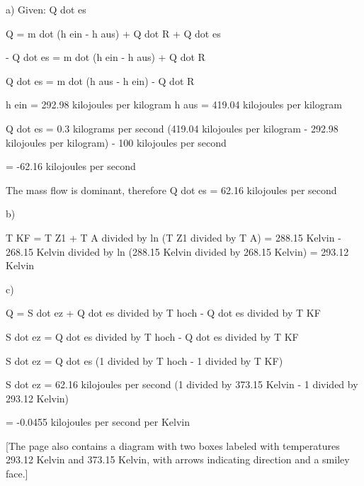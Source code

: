 a) Given: Q dot es

Q = m dot (h ein - h aus) + Q dot R + Q dot es

- Q dot es = m dot (h ein - h aus) + Q dot R

Q dot es = m dot (h aus - h ein) - Q dot R

h ein = 292.98 kilojoules per kilogram
h aus = 419.04 kilojoules per kilogram

Q dot es = 0.3 kilograms per second (419.04 kilojoules per kilogram - 292.98 kilojoules per kilogram) - 100 kilojoules per second

= -62.16 kilojoules per second

The mass flow is dominant, therefore Q dot es = 62.16 kilojoules per second

b)

T KF = T Z1 + T A divided by ln (T Z1 divided by T A) = 288.15 Kelvin - 268.15 Kelvin divided by ln (288.15 Kelvin divided by 268.15 Kelvin) = 293.12 Kelvin

c)

Q = S dot ez + Q dot es divided by T hoch - Q dot es divided by T KF

S dot ez = Q dot es divided by T hoch - Q dot es divided by T KF

S dot ez = Q dot es (1 divided by T hoch - 1 divided by T KF)

S dot ez = 62.16 kilojoules per second (1 divided by 373.15 Kelvin - 1 divided by 293.12 Kelvin)

= -0.0455 kilojoules per second per Kelvin

[The page also contains a diagram with two boxes labeled with temperatures 293.12 Kelvin and 373.15 Kelvin, with arrows indicating direction and a smiley face.]